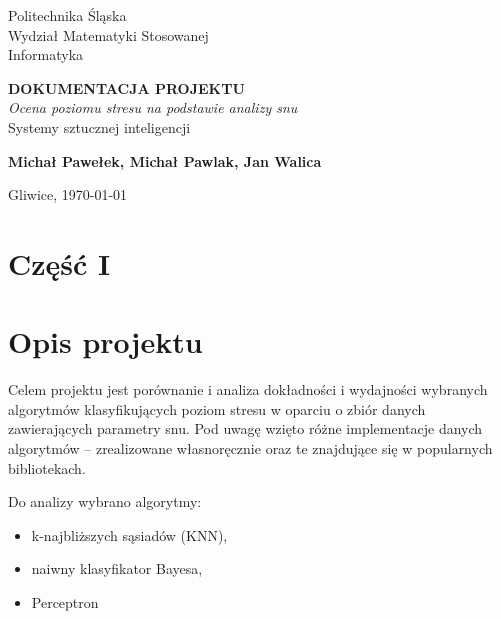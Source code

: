 \documentclass[12pt,a4paper]{article}
\begin{document}

\begin{titlepage}

    \noindent \footnotesize Politechnika Śląska \\
    Wydział Matematyki Stosowanej \\
    Informatyka
    
    \begin{center}
    	\vspace*{2cm}
        
        \LARGE{\textbf{DOKUMENTACJA PROJEKTU}} \\

        \vspace{0.5cm}
        \Large \textit{Ocena poziomu stresu na podstawie analizy snu} \\ [.2cm]

        \large Systemy sztucznej inteligencji \\        		
               
        \vspace{1.5cm} 
        
        \normalsize{\textbf{Michał Pawełek, Michał Pawlak, Jan Walica}}

		\vspace{13.5cm}
         
        Gliwice, \today
    \end{center}
\end{titlepage}
	
	\newpage
{}
	\tableofcontents
	
	\newpage
    \section*{Część I}
    
	\section{Opis projektu}
    	Celem projektu jest porównanie i analiza dokładności i wydajności wybranych algorytmów klasyfikujących poziom stresu w oparciu o zbiór danych zawierających parametry snu. Pod uwagę wzięto różne implementacje danych algorytmów -- zrealizowane własnoręcznie oraz te znajdujące się w popularnych bibliotekach.
    	
    	Do analizy wybrano algorytmy:
    	\begin{itemize}
    	    \item k-najbliższych sąsiadów (KNN),
    	    \item naiwny klasyfikator Bayesa,
    	    \item Perceptron
    	\end{itemize}
    	
\end{document}
